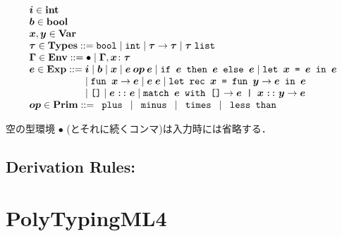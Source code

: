 \documentclass[11pt]{jarticle}
\begin{document}
\[\begin{array}{l}
\TypingMLivMV{i}[] \in \mathbf{int}\\
\TypingMLivMV{b}[] \in \mathbf{bool}\\
\TypingMLivMV{x}[], \TypingMLivMV{y}[] \in \mathbf{Var}\\
\TypingMLivMV{t}[] \in \mathbf{Types} ::= \TypingMLivTyBoolTerm
\mid \TypingMLivTyIntTerm \mid \TypingMLivTyFunTerm{\TypingMLivMV{t}[]}
{\TypingMLivMV{t}[]}
\mid \TypingMLivTyListTerm{\TypingMLivMV{t}[]}\\
\TypingMLivMV{env}[] \in \mathbf{Env} ::= \TypingMLivEmptyTerm
\mid \TypingMLivBindTerm{\TypingMLivMV{env}[]}{\TypingMLivMV{x}[]}
{\TypingMLivMV{t}[]}\\
\TypingMLivMV{e}[] \in \mathbf{Exp} ::= \TypingMLivMV{i}[]
\mid \TypingMLivMV{b}[] \mid \TypingMLivMV{x}[]
\mid \TypingMLivBinOpTerm{\TypingMLivMV{op}[]}{\TypingMLivMV{e}[]}
{\TypingMLivMV{e}[]} \mid \TypingMLivIfTerm{\TypingMLivMV{e}[]}
{\TypingMLivMV{e}[]}{\TypingMLivMV{e}[]}
\mid \TypingMLivLetTerm{\TypingMLivMV{x}[]}{\TypingMLivMV{e}[]}
{\TypingMLivMV{e}[]}  \\ \hspace*{2.0cm}
\mid \TypingMLivAbsTerm{\TypingMLivMV{x}[]}
{\TypingMLivMV{e}[]} \mid \TypingMLivAppTerm{\TypingMLivMV{e}[]}
{\TypingMLivMV{e}[]} \mid \TypingMLivLetRecTerm{\TypingMLivMV{x}[]}
{\TypingMLivMV{y}[]}{\TypingMLivMV{e}[]}{\TypingMLivMV{e}[]}
 \\ \hspace*{2.0cm}
\mid \TypingMLivNilTerm \mid \TypingMLivConsTerm{\TypingMLivMV{e}[]}
{\TypingMLivMV{e}[]} \mid \TypingMLivMatchTerm{\TypingMLivMV{e}[]}
{\TypingMLivMV{e}[]}{\TypingMLivMV{x}[]}{\TypingMLivMV{y}[]}
{\TypingMLivMV{e}[]}\\
\TypingMLivMV{op}[] \in \mathbf{Prim} ::= \TypingMLivPlusTerm
\mid \TypingMLivMinusTerm \mid \TypingMLivMultTerm
\mid \TypingMLivLtTerm\\
\end{array}\]

空の型環境 \(\bullet\) (とそれに続くコンマ)は入力時には省略する．

\subsection*{Derivation Rules:}
\TypingMLivDisplayRules

\newpage

\section*{PolyTypingML4}
\end{document}
